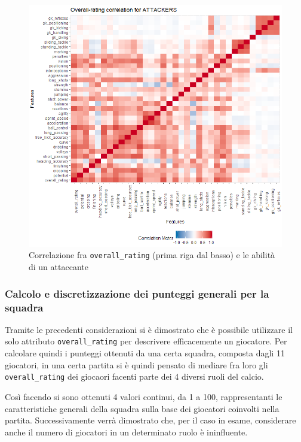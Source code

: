 \documentclass[hidelinks, 12pt]{article}
\begin{document}
\begin{figure}[H]
	\centering
	\includegraphics[scale=0.8]{images/04_05_atk_corr.png}
	\caption[Correlazione fra \texttt{overall\_rating} (prima riga dal basso) e le abilità di un attaccante]{Correlazione fra \texttt{overall\_rating} (prima riga dal basso) e le abilità di un attaccante}
	\label{img:dataset-atk-corr}
\end{figure}


\clearpage
\subsubsection{Calcolo e discretizzazione dei punteggi generali per la squadra}

Tramite le precedenti considerazioni si è dimostrato che è possibile utilizzare il solo attributo \texttt{overall\_rating} per descrivere efficacemente un giocatore. Per calcolare quindi i punteggi ottenuti da una certa squadra, composta dagli 11 giocatori, in una certa partita si è quindi pensato di mediare fra loro gli \texttt{overall\_rating} dei giocaori facenti parte dei 4 diversi ruoli del calcio.

Così facendo si sono ottenuti 4 valori continui, da 1 a 100, rappresentanti le caratteristiche generali della squadra sulla base dei giocatori coinvolti nella partita. Successivamente verrà dimostrato che, per il caso in esame, considerare anche il numero di giocatori in un determinato ruolo è ininfluente.
\end{document}
